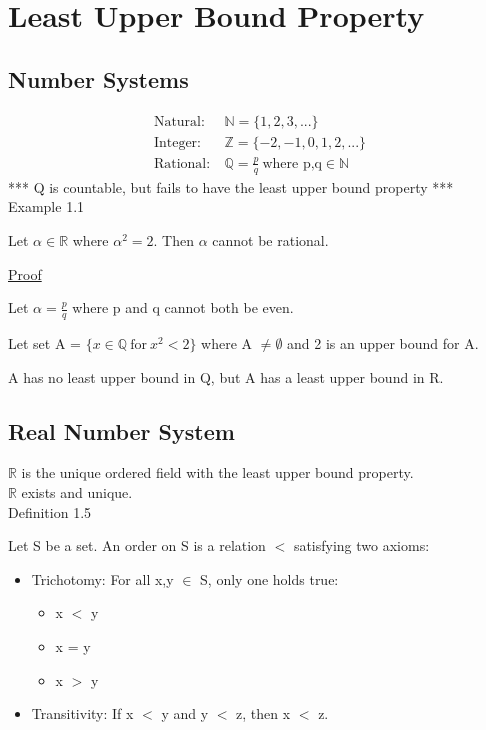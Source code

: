 \newpage
\section[Day 1: The Real Number System]{Least Upper Bound Property}

\subsection{Number Systems}

\begin{align*}
	\text{Natural}:\ & \mathbb{N} = \{1, 2, 3, ... \} \\
	\text{Integer}:\ & \mathbb{Z} = \{-2, -1, 0, 1, 2, ... \} \\
	\text{Rational}:\ & \mathbb{Q} = \frac{p}{q} \ \text{where p,q} \in \mathbb{N}
\end{align*}
*** Q is countable, but fails to have the least upper bound property *** \\

{ \color{red} Example 1.1 }

\qquad Let $ \alpha \in \mathbb{R} $ where $ \alpha^2 = 2 $. Then $ \alpha $ cannot be rational.

{ \color{magenta} \underline{Proof} }

Let $ \alpha = \frac{p}{q} $ where p and q cannot both be even.

Let set A = $\{ x \in \mathbb{Q} \ \text{for} \ x^2 < 2 \} $ where A $ \neq \emptyset $
and 2 is an upper bound for A.

A has no least upper bound in Q, but A has a least upper bound in R.

\subsection{Real Number System}

$ \mathbb{R} $ is the unique ordered field with the least upper bound property. \\
$ \mathbb{R} $ exists and unique. \\

{ \color{blue} Definition 1.5 }

\qquad Let S be a set. An order on S is a relation $<$ satisfying two axioms:

\begin{itemize}
	\item Trichotomy: For all x,y $ \in $ S, only one holds true:
		\begin{itemize}
			\item x $<$ y
			\item x = y
			\item x $>$ y
		\end{itemize}
	\item Transitivity: If x $<$ y and y $<$ z, then x $<$ z.
\end{itemize}

